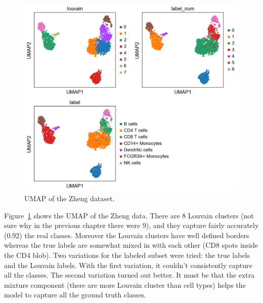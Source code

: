 \documentclass[11pt, a4paper]{report}
\theoremstyle{plain}
\theoremstyle{definition}
\theoremstyle{remark}
\begin{document}
\begin{figure}[h]
\centering
\includegraphics[width=1.1\textwidth]{images/gmmvae_zheng_new_louvain_umap1.png}
\caption{
UMAP of the Zheng dataset.
}
\label{fig:zheng_pca_umap_new}
\end{figure}

Figure~\ref{fig:zheng_pca_umap_new} shows the UMAP of the Zheng data. There are
8 Louvain clusters (not sure why in the previous chapter there were 9), and they
capture fairly accurately (0.92) the real classes. Moreover the Louvain clusters
have well defined borders whereas the true labels are somewhat mixed in with
each other (CD8 spots inside the CD4 blob).
Two variations for the
labeled subset were tried: the true labels and the Louvain labels. With the
first variation, it couldn't consistently capture all the
classes. The second variation turned out better. 
It must be that the extra mixture
component (there are more Louvain cluster than cell types) helps the model to
capture all the ground truth classes.
\end{document}
